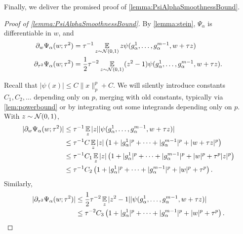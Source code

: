 \documentclass[main.tex]{subfiles}
\begin{document}
Finally, we deliver the promised proof of \cref{lemma:PsiAlphaSmoothnessBound}.

\begin{proof}[Proof of \cref{lemma:PsiAlphaSmoothnessBound}]

By \cref{lemma:stein}, $\Psi_\alpha$ is differentiable in $w$, and
\begin{align}
    \pd_w \Psi_\alpha(w; \tau^2)
    &=
        \inv \tau \EV_{z \sim \Gaus(0, 1)} z \psi(g^1_\alpha, \ldots, g^{\MM - 1}_\alpha, w+ \tau z)
        \label{eqn:PsiAlphaDW}
        \\
    \pd_{\tau^2} \Psi_\alpha(w; \tau^2)
    &=
        \f 1 2 \tau^{-2}
        \EV_{z \sim \Gaus(0, 1)} (z^2-1) \psi(g^1_\alpha, \ldots, g^{\MM - 1}_\alpha, w+ \tau z)
        .
        \label{eqn:PsiAlphaDTau2}
\end{align}

Recall that $|\psi(x)| \le C \|x\|^p_{p} + C$.
We will silently introduce constants $C_1, C_2, \ldots$ depending only on $p$, merging with old constants, typically via \cref{lem:powerbound} or by integrating out some integrands depending only on $p$.
With $z \sim \mathcal{N}(0, 1)$,
\begin{align*}
|\partial_w \Psi_\alpha(w; \tau^2)|
    &\le
        {\tau}^{-1} \operatorname*{\mathbb{E}}_{z} |z| |\psi(g^1_\alpha, \ldots, g^{m - 1}_\alpha, w+ \tau z)|
        \\
    &\le
        {\tau}^{-1} C\operatorname*{\mathbb{E}}_z |z| \left( 1 + |g^1_\alpha|^{p} + \cdots + |g^{m-1}_\alpha|^p + |w + \tau z|^p \right)
        \\
    &\le
        {\tau}^{-1} C_1\operatorname*{\mathbb{E}}_z |z| \left( 1 + |g^1_\alpha|^{p} + \cdots + |g^{m-1}_\alpha|^p + |w|^p + \tau^p |z|^p \right)
        \\
    &\le
        {\tau}^{-1} C_2 \left( 1 + |g^1_\alpha|^{p} + \cdots + |g^{m-1}_\alpha|^p + |w|^p + \tau^p \right)
        .
\end{align*}
Similarly,
\begin{align*}
|\partial_{\tau^2} \Psi_\alpha(w; \tau^2)|
    &\le
        \frac{1}{2} \tau^{-2} \operatorname*{\mathbb{E}}_z |z^2-1| |\psi(g^1_\alpha, \ldots, g^{m - 1}_\alpha, w+ \tau z)|
        \\
    &\le
        \tau^{-2} C_3 \left( 1 + |g^1_\alpha|^{p} + \cdots + |g^{m-1}_\alpha|^p + |w|^p + \tau^p \right)
        .
\end{align*}


\end{proof}
\end{document}
